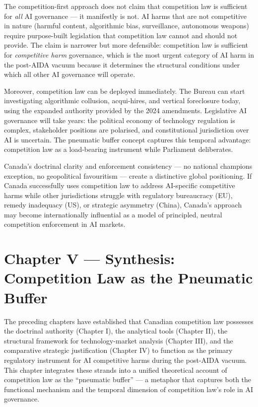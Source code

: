 The competition-first approach does not claim that competition law is sufficient for \textit{all} AI governance --- it manifestly is not. AI harms that are not competitive in nature (harmful content, algorithmic bias, surveillance, autonomous weapons) require purpose-built legislation that competition law cannot and should not provide. The claim is narrower but more defensible: competition law is sufficient for \textit{competitive harm} governance, which is the most urgent category of AI harm in the post-AIDA vacuum because it determines the structural conditions under which all other AI governance will operate.

Moreover, competition law can be deployed immediately. The Bureau can start investigating algorithmic collusion, acqui-hires, and vertical foreclosure today, using the expanded authority provided by the 2024 amendments. Legislative AI governance will take years: the political economy of technology regulation is complex, stakeholder positions are polarised, and constitutional jurisdiction over AI is uncertain. The pneumatic buffer concept captures this temporal advantage: competition law as a load-bearing instrument while Parliament deliberates.

Canada's doctrinal clarity and enforcement consistency --- no national champions exception, no geopolitical favouritism --- create a distinctive global positioning. If Canada successfully uses competition law to address AI-specific competitive harms while other jurisdictions struggle with regulatory bureaucracy (EU), remedy inadequacy (US), or strategic asymmetry (China), Canada's approach may become internationally influential as a model of principled, neutral competition enforcement in AI markets.


\section{Chapter V --- Synthesis: Competition Law as the Pneumatic Buffer}
\label{ch:synthesis}

The preceding chapters have established that Canadian competition law possesses the doctrinal authority (Chapter I), the analytical tools (Chapter II), the structural framework for technology-market analysis (Chapter III), and the comparative strategic justification (Chapter IV) to function as the primary regulatory instrument for AI competitive harms during the post-AIDA vacuum. This chapter integrates these strands into a unified theoretical account of competition law as the ``pneumatic buffer'' --- a metaphor that captures both the functional mechanism and the temporal dimension of competition law's role in AI governance.

